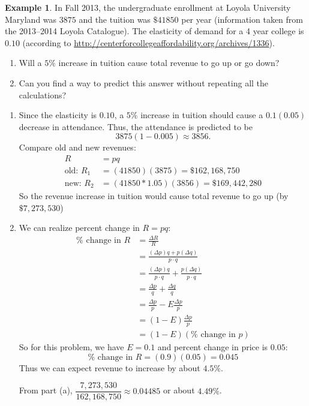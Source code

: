 \documentclass[oneside]{book}
\theoremstyle{definition}
\newtheorem{example}{Example}
\theoremstyle{solution}
\newtheorem*{solution}{Solution}
\newenvironment{solution}{\vspace{2in}\comment}{\endcomment}
\begin{document}
\begin{example}
  In Fall 2013, the undergraduate enrollment at Loyola University
  Maryland was $3875$ and the tuition was $\$41850$ per year
  (information taken from the 2013--2014 Loyola Catalogue).  The
  elasticity of demand for a 4 year college is $0.10$ (according to
  \url{http://centerforcollegeaffordability.org/archives/1336}).

  \begin{enumerate}
  \item Will a $5\%$ increase in tuition cause total revenue to go up
    or go down?

  \item Can you find a way to predict this answer without repeating
    all the calculations?
  \end{enumerate}
\end{example}

\begin{solution}
  \begin{enumerate}
  \item Since the elasticity is $0.10$, a $5\%$ increase in tuition
    should cause a $0.1(0.05)$ decrease in attendance. Thus, the
    attendance is predicted to be
    $$
    3875(1 - 0.005) \approx 3856.
    $$
    Compare old and new revenues:
    \begin{align*}
      R &= pq\\
      \text{old: }R_1 & = (41850)(3875) = \$162,168,750\\
      \text{new: }R_2 & = (41850*1.05)(3856) = \$169,442,280
    \end{align*}
    So the revenue increase in tuition would cause total revenue to go
    up (by $\$7,273,530$)

  \item We can realize percent change in $R = pq$:
    \begin{align*}
      \%\text{ change in }R 
      & = \frac{\Delta R}{R}\\
      & = \frac{ (\Delta p)q + p(\Delta q)}{p\cdot q}\\
      & = \frac{ (\Delta p)q}{p\cdot q} + \frac{p(\Delta q)}{p\cdot q}\\
      & = \frac{\Delta p}{q} + \frac{\Delta q}{q}\\
      & = \frac{\Delta p}{p} - E\frac{\Delta p}{p}\\
      & = (1-E)\frac{\Delta p}{p}\\
      & = (1-E)(\% \text{ change in }p)
    \end{align*}
    So for this problem, we have $E = 0.1$ and percent change in price
    is $0.05$:
    $$
    \%\text{ change in }R = (0.9)(0.05) = 0.045
    $$
    Thus we can expect revenue to increase by about $4.5\%$.
    
    From part (a), $\dfrac{7,273,530}{162,168,750} \approx 0.04485$ or
    about $4.49\%$.
  \end{enumerate}
\end{solution}
  
\end{document}
